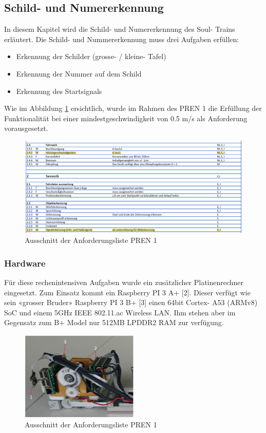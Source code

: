 \documentclass[../../main.tex]{subfiles}
\begin{document}
\subsection{Schild- und Numererkennung}
In diesem Kapitel wird die Schild- und Numererkennung des Soul- Trains erläutert. Die Schild- und Nummererkennung muss drei Aufgaben erfüllen:
\begin{itemize}
  \item Erkennung der Schilder (grosse- / kleine- Tafel)
  \item Erkennung der Nummer auf dem Schild
  \item Erkennung des Startsignals
\end{itemize}

Wie im Abbildung \ref{fig:ausschnitt_Anforderungsliste} ersichtlich, wurde im Rahmen des PREN 1 die Erfüllung der Funktionalität bei einer mindestgeschwindigkeit von 0.5 m/s als Anforderung vorausgesetzt. 

\begin{figure}[H] %
  \centering
  \includegraphics[width=1\textwidth]{Anforderung.png}
  \caption{Ausschnitt der Anforderungsliste PREN 1}
  \label{fig:ausschnitt_Anforderungsliste}
\end{figure}


\subsubsection{Hardware}
Für diese rechenintensiven Aufgaben wurde ein zusätzlicher Platinenrechner eingesetzt. Zum Einsatz kommt ein Raspberry PI 3 A+ [2]. Dieser verfügt wie sein «grosser Bruder» Raspberry PI 3 B+ [3] einen 64bit Cortex- A53 (ARMv8) SoC und einem 5GHz IEEE 802.11.ac Wireless LAN. Ihm stehen aber im Gegensatz zum B+ Model nur 512MB LPDDR2 RAM zur verfügung.   

\begin{figure}[H] %
  \centering
  \includegraphics[width=0.5\textwidth]{RPI-uebersicht.png}
  \caption{Ausschnitt der Anforderungsliste PREN 1}
  \label{fig:rpi-uebersicht}
\end{figure}
\end{document}

